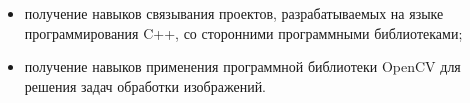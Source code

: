 
\begin{itemize}

	\item получение навыков связывания проектов, разрабатываемых на языке программирования C++, со сторонними программными библиотеками;
	\item получение навыков применения программной библиотеки OpenCV для решения задач обработки изображений.

\end{itemize}

